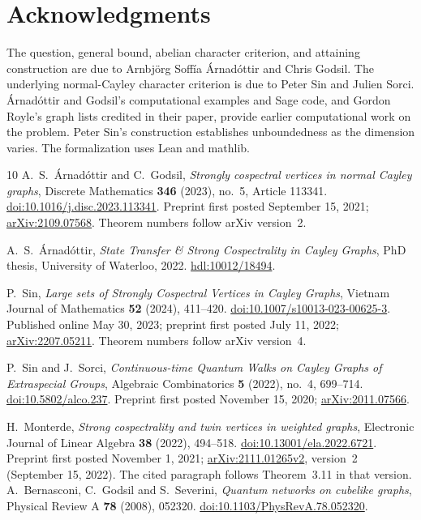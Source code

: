\documentclass[11pt]{article}
\theoremstyle{definition}
\begin{document}
\section*{Acknowledgments}
The question, general bound, abelian character criterion, and attaining
construction are due to Arnbj\"org Soff\'ia \'Arnad\'ottir and Chris
Godsil. The underlying normal-Cayley character criterion is due to
Peter Sin and Julien Sorci. \'Arnad\'ottir and Godsil's computational
examples and Sage code, and Gordon Royle's
graph lists credited in their paper, provide earlier computational
work on the problem. Peter Sin's construction establishes unboundedness
as the dimension varies. The formalization uses Lean and mathlib.

{\small
\begin{thebibliography}{10}
A.~S.~\'Arnad\'ottir and C.~Godsil,
\emph{Strongly cospectral vertices in normal Cayley graphs},
Discrete Mathematics \textbf{346} (2023), no.~5, Article 113341.
\href{https://doi.org/10.1016/j.disc.2023.113341}{doi:10.1016/j.disc.2023.113341}.
Preprint first posted September 15, 2021;
\href{https://arxiv.org/abs/2109.07568}{arXiv:2109.07568}.
Theorem numbers follow arXiv version~2.

A.~S.~\'Arnad\'ottir,
\emph{State Transfer \& Strong Cospectrality in Cayley Graphs},
PhD thesis, University of Waterloo, 2022.
\href{http://hdl.handle.net/10012/18494}{hdl:10012/18494}.

P.~Sin, \emph{Large sets of Strongly Cospectral Vertices in Cayley Graphs},
Vietnam Journal of Mathematics \textbf{52} (2024), 411--420.
\href{https://doi.org/10.1007/s10013-023-00625-3}{doi:10.1007/s10013-023-00625-3}.
Published online May 30, 2023; preprint first posted July 11, 2022;
\href{https://arxiv.org/abs/2207.05211}{arXiv:2207.05211}.
Theorem numbers follow arXiv version~4.

P.~Sin and J.~Sorci,
\emph{Continuous-time Quantum Walks on Cayley Graphs of Extraspecial Groups},
Algebraic Combinatorics \textbf{5} (2022), no.~4, 699--714.
\href{https://doi.org/10.5802/alco.237}{doi:10.5802/alco.237}.
Preprint first posted November 15, 2020;
\href{https://arxiv.org/abs/2011.07566}{arXiv:2011.07566}.

H.~Monterde, \emph{Strong cospectrality and twin vertices in weighted graphs},
Electronic Journal of Linear Algebra \textbf{38} (2022), 494--518.
\href{https://doi.org/10.13001/ela.2022.6721}{doi:10.13001/ela.2022.6721}.
Preprint first posted November 1, 2021;
\href{https://arxiv.org/abs/2111.01265v2}{arXiv:2111.01265v2}, version~2 (September 15, 2022).
The cited paragraph follows Theorem~3.11 in that version.
A.~Bernasconi, C.~Godsil and S.~Severini,
\emph{Quantum networks on cubelike graphs},
Physical Review A \textbf{78} (2008), 052320.
\href{https://doi.org/10.1103/PhysRevA.78.052320}{doi:10.1103/PhysRevA.78.052320}.


\end{thebibliography}}
\end{document}
